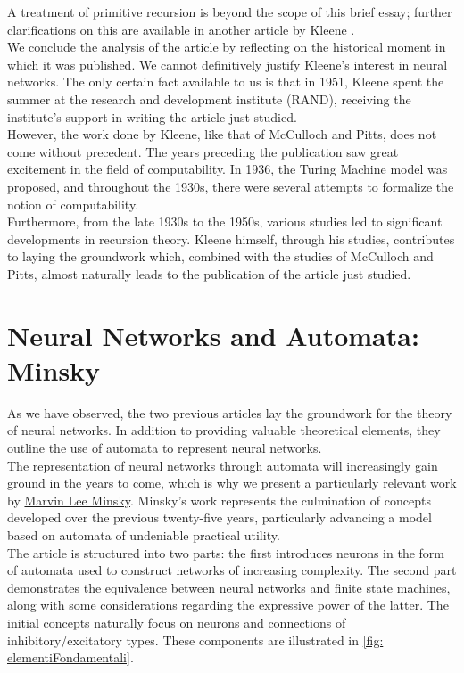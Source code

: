 \documentclass[10pt]{article}
\begin{document}
A treatment of primitive recursion is beyond the scope of this brief essay; further clarifications on this are available in another article by Kleene \cite{Kleene1952}.\\
We conclude the analysis of the article by reflecting on the historical moment in which it was published. We cannot definitively justify Kleene's interest in neural networks. The only certain fact available to us is that in 1951, Kleene spent the summer at the research and development institute (RAND), receiving the institute's support in writing the article just studied.\\
However, the work done by Kleene, like that of McCulloch and Pitts, does not come without precedent. The years preceding the publication saw great excitement in the field of computability. In 1936, the Turing Machine model was proposed, and throughout the 1930s, there were several attempts to formalize the notion of computability.\\
Furthermore, from the late 1930s to the 1950s, various studies led to significant developments in recursion theory. Kleene himself, through his studies, contributes to laying the groundwork which, combined with the studies of McCulloch and Pitts, almost naturally leads to the publication of the article just studied.


\section{Neural Networks and Automata: Minsky}

As we have observed, the two previous articles lay the groundwork for the theory of neural networks. In addition to providing valuable theoretical elements, they outline the use of automata to represent neural networks.\\
The representation of neural networks through automata will increasingly gain ground in the years to come, which is why we present a particularly relevant work \cite{Minsky1967} by \href{https://en.wikipedia.org/wiki/Marvin_Minsky}{Marvin Lee Minsky}. Minsky's work represents the culmination of concepts developed over the previous twenty-five years, particularly advancing a model based on automata of undeniable practical utility.\\
The article is structured into two parts: the first introduces neurons in the form of automata used to construct networks of increasing complexity. The second part demonstrates the equivalence between neural networks and finite state machines, along with some considerations regarding the expressive power of the latter. The initial concepts naturally focus on neurons and connections of inhibitory/excitatory types. These components are illustrated in \autoref{fig: elementiFondamentali}.
\end{document}
